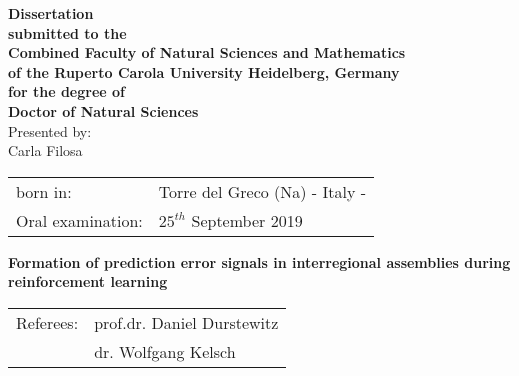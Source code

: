 \thispagestyle{plain}

\vspace*{1cm}

\begin{center}
\begin{large}
{\textbf{Dissertation\\submitted to the\\Combined Faculty of Natural Sciences and Mathematics\\of the Ruperto Carola University Heidelberg, Germany\\for the degree of\\Doctor of Natural Sciences}}\\
\vspace{10cm}
Presented by:\\ Carla Filosa\\
\vspace{1cm}
\begin{tabular}{ll}
born in: & Torre del Greco (Na) - Italy - \\
Oral examination: &  $25^{th}$ September 2019 \\
\end{tabular}
\end{large}
\end{center}
\afterpage{\blankpage}
\clearpage
\thispagestyle{plain}

\begin{center}
\begin{large}
\vspace*{3cm}
{\Huge \textbf{Formation of prediction error signals in interregional assemblies during reinforcement learning}}

\vspace*{10cm}

\begin{tabular}{ll}
Referees: & prof.dr. Daniel Durstewitz \\
&  dr. Wolfgang Kelsch \\
\end{tabular}
\end{large}
\end{center}



